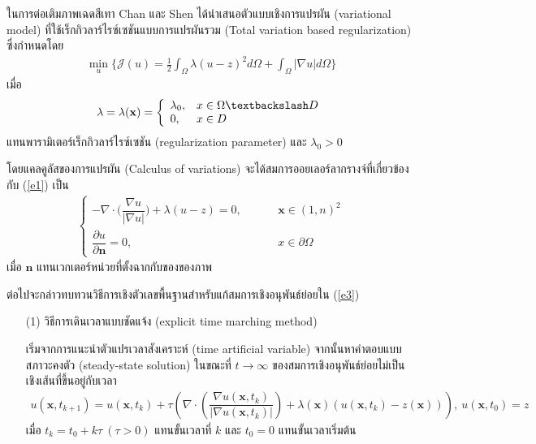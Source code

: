 \documentclass[hidelinks,a4paper]{article}
\numberwithin{equation}{section}							%
\begin{document}
{\hspace{1cm} ในการต่อเติมภาพเฉดสีเทา Chan และ Shen \cite{ref:rof-inpaint-chan-shen} ได้นำเสนอตัวแบบเชิงการแปรผัน (variational model) ที่ใช้เร็กกิวลาร์ไรซ์เซชันแบบการแปรผันรวม (Total variation based regularization) ซึ่งกำหนดโดย
\begin{align}
\min_{u} \{ \mathcal{J}(u) = \frac{1}{2} \int_{\Omega}\lambda (u-z)^2 d\Omega +  \int_{\Omega}  |\nabla u|  d\Omega \}
\label{e1}
\end{align}
เมื่อ 
\begin{align}
\lambda=\lambda(\mathbf{x}) = \left \{ \begin{array}{ll}  \lambda_0, & x \in \Omega \textbackslash D \\ 0, & x \in D  \end{array} \right . 
\label{e2}
\end{align}
แทนพารามิเตอร์เร็กกิวลาร์ไรซ์เซชัน (regularization parameter) และ $\lambda_0 >0$

\hspace{1cm} โดยแคลคูลัสของการแปรผัน (Calculus of variations) จะได้สมการออยเลอร์ลากรางจ์ที่เกี่ยวข้องกับ (\ref{e1}) เป็น 
\begin{align}
\left \{ \begin{array}{ll}  - \nabla \cdot  \Big( \dfrac{\nabla u}{|\nabla u|} \Big) + \lambda (u-z) = 0,  & \hspace{1cm} \mathbf{x} \in (1,n)^2 \\ \dfrac{\partial u}{\partial \boldsymbol{n}} = 0, & \hspace{1cm} x \in \partial \Omega \end{array} \right . 
\label{e3}
\end{align}
เมื่อ $\boldsymbol{n}$ แทนเวกเตอร์หน่วยที่ตั้งฉากกับของของภาพ

\hspace{1cm} ต่อไปจะกล่าวทบทวนวิธีการเชิงตัวเลขพื้นฐานสำหรับแก้สมการเชิงอนุพันธ์ย่อยใน (\ref{e3}) 

\begin{itemize}
	\item [(1)] วิธีการเดินเวลาแบบชัดแจ้ง (explicit time marching method) 
	
	เริ่มจากการแนะนําตัวแปรเวลาสังเคราะห์ (time artificial variable) จากนั้นหาคําตอบแบบสภาวะคงตัว (steady-state solution) ในขณะที่ $t\rightarrow \infty$ ของสมการเชิงอนุพันธ์ย่อยไม่เป็นเชิงเส้นที่ขึ้นอยู่กับเวลา 
	\begin{align}
	u(\mathbf{x},t_{k+1})=u(\mathbf{x},t_{k})+\tau\left(\nabla \cdot\left(\dfrac{\nabla u (\mathbf{x},t_k)}{| \nabla u (\mathbf{x},t_k) | }\right) + \lambda(\mathbf{x})(u (\mathbf{x},t_k)-z(\mathbf{x})) \right),\ u(\mathbf{x},t_0)=z
	\label{e4}
	\end{align}
	เมื่อ $t_k=t_0+k\tau\ (\tau>0)$  แทนขั้นเวลาที่ $k$ และ $t_0=0$ แทนขั้นเวลาเริ่มต้น
	

\end{itemize}}
\end{document}
